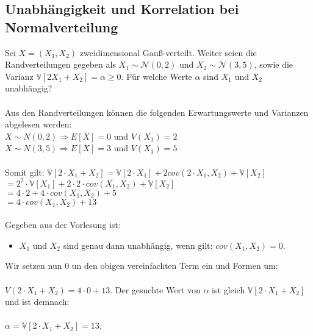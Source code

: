 \documentclass[a4paper]{article}
\begin{document}
\setcounter{section}{10}
\subsection{Unabhängigkeit und Korrelation bei Normalverteilung}
Sei $X = (X_1, X_2)$ zweidimensional Gauß-verteilt. Weiter seien die Randverteilungen gegeben als $X_1 \sim \mathcal{N}(0,2)$ und $X_2 \sim \mathcal{N}(3,5)$, sowie die Varianz $\mathbb{V}[2X_1+X_2]=\alpha \geq 0$. Für welche Werte $\alpha$ sind $X_1$ und $X_2$ unabhängig?\\\\
Aus den Randverteilungen können die folgenden Erwartungswerte und Varianzen abgelesen werden:\\
$X \sim N(0,2) \Rightarrow E[X] = 0$ und $V(X_1) = 2$\\
$X \sim N(3,5) \Rightarrow E[X] = 3$ und $V(X_1) = 5$\\\\
Somit gilt: $\mathbb{V}[2 \cdot X_1 + X_2] = \mathbb{V}[2 \cdot X_1] + 2 cov(2 \cdot X_1, X_2) + \mathbb{V}[X_2]$\\
\hspace*{4.2cm}$= 2^2 \cdot \mathbb{V}[X_1] + 2 \cdot 2 \cdot cov(X_1, X_2) + \mathbb{V}[X_2]$\\
\hspace*{4.2cm}$= 4 \cdot 2 + 4 \cdot cov(X_1, X_2) + 5$\\
\hspace*{4.2cm}$= 4 \cdot cov(X_1, X_2) + 13$\\\\
Gegeben aus der Vorlesung ist: 
\begin{itemize}
    \item $X_1$ und $X_2$ sind genau dann unabhängig, wenn gilt: $cov(X_1, X_2) = 0$.
\end{itemize}
Wir setzen nun $0$ un den obigen vereinfachten Term ein und Formen um:\\\\
$V(2 \cdot X_1 + X_2) = 4 \cdot 0 + 13$. Der gesuchte Wert von $\alpha$ ist gleich $\mathbb{V}[2 \cdot X_1 + X_2]$ und ist demnach:\\\\
$\alpha = \mathbb{V}[2 \cdot X_1 + X_2] = 13$.
\\\\
\end{document}
